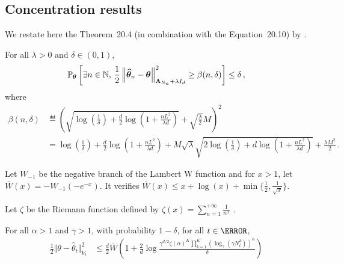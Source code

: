 \subsection{Concentration results}\label{app:lgc.lemmas.concentration}

We restate here the Theorem~20.4 (in combination with the Equation~20.10) by \citet{lattimore2018bandits}.
\begin{theorem}
\label{th:confidence_beta}
For all $\lambda >0$ and $\delta\in(0,1)$,
\[
    \mathbb{P}_{\boldsymbol \theta}\left[\exists n\in{\mathbb N},\, \frac{1}{2}\left\lVert\widehat{{\boldsymbol \theta}}_n-{\boldsymbol \theta}\right\rVert^2_{{\boldsymbol \Lambda}_{N_n}+\lambda I_d} \geq \beta(n,\delta)\right] \leq \delta\,,
\]
where
\begin{align*}
    \beta(n,\delta) &\eqdef  \left( \sqrt{\log\left( \frac{1}{\delta}\right)+\frac{d}{2}\log\left(1+\frac{n L^2}{\lambda d} \right)} +\sqrt{\frac{\lambda}{2}}M\right)^2\\
    &=\log\!\left( \frac{1}{\delta}\right)+\frac{d}{2}\log\left(1+\frac{n L^2}{\lambda d} \right) +  M\sqrt{\lambda}\sqrt{2\log\left( \frac{1}{\delta}\right)+d\log\!\left(1+\frac{n L^2}{\lambda d} \right)}+\frac{\lambda M^2}{2}\,.
\end{align*}
\end{theorem}


\iffalse
Let $W_{-1}$ be the negative branch of the Lambert W function and for $x>1$, let $\overline{W}(x) = -W_{-1}(-e^{-x})$. It verifies $\overline{W}(x) \le x + \log(x) + \min\{\frac{1}{2}, \frac{1}{\sqrt{x}}\}$.

Let $\zeta$ be the Riemann function defined by $\zeta(x) = \sum_{n=1}^{+\infty}\frac{1}{n^x}$ .

\begin{theorem}\label{thm:maximal_concentration_inequality}
For all $\alpha>1$ and $\gamma>1$, with probability $1-\delta$, for all $t\in \N$,
\begin{align*}
\frac{1}{2} \Vert \theta - \hat{\theta}_t \Vert_{V_t}^2
&\le \frac{d}{2} \overline{W}\left( 1 + \frac{2}{d}\log \frac{\gamma^{d/2}\zeta(\alpha)^K\prod_{k=1}^K(\log_\gamma(\gamma N_t^k))^\alpha}{\delta} \right)
\end{align*}
\end{theorem}


